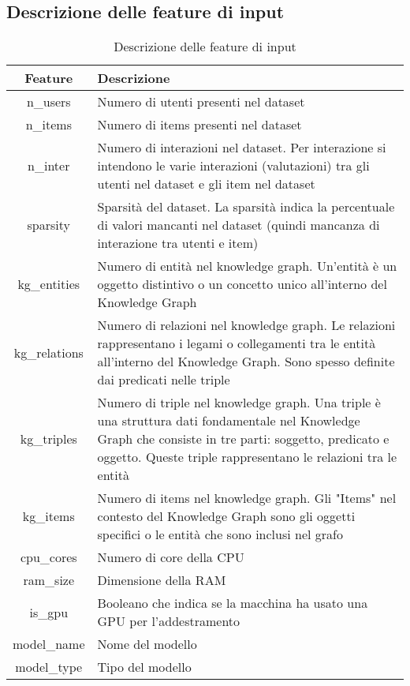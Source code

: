 \subsection{Descrizione delle feature di input}
\begin{center}
\begin{table}[H]
    \centering
    \begin{tabularx}{\textwidth}{|c|X|}
        \hline
        \textbf{Feature} & \textbf{Descrizione} \\
        \hline
        n\_users & Numero di utenti presenti nel dataset \\
        \hline
        n\_items & Numero di items presenti nel dataset \\
        \hline
        n\_inter & Numero di interazioni nel dataset. Per interazione si intendono le varie interazioni (valutazioni) tra gli utenti nel dataset e gli item nel dataset \\
        \hline
        sparsity & Sparsità del dataset. La sparsità indica la percentuale di valori mancanti nel dataset (quindi mancanza di interazione tra utenti e item)\\
        \hline
        kg\_entities & Numero di entità nel knowledge graph. Un'entità è un oggetto distintivo o un concetto unico all'interno del Knowledge Graph \\
        \hline
        kg\_relations & Numero di relazioni nel knowledge graph. Le relazioni rappresentano i legami o collegamenti tra le entità all'interno del Knowledge Graph. Sono spesso definite dai predicati nelle triple \\
        \hline
        kg\_triples & Numero di triple nel knowledge graph. Una triple è una struttura dati fondamentale nel Knowledge Graph che consiste in tre parti: soggetto, predicato e oggetto. Queste triple rappresentano le relazioni tra le entità \\
        \hline
        kg\_items & Numero di items nel knowledge graph. Gli "Items" nel contesto del Knowledge Graph sono gli oggetti specifici o le entità che sono inclusi nel grafo \\
        \hline
        cpu\_cores & Numero di core della CPU \\
        \hline
        ram\_size & Dimensione della RAM \\
        \hline
        is\_gpu & Booleano che indica se la macchina ha usato una GPU per l'addestramento \\
        \hline
        model\_name & Nome del modello \\
        \hline
        model\_type & Tipo del modello \\
        \hline
    \end{tabularx}
    \caption*{Descrizione delle feature di input}
\end{table}
\end{center}


